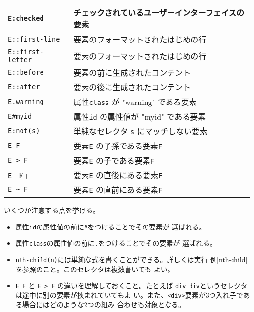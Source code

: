 \begin{longtable}{|m{13em}|m{}|}
\Verb+E:checked+&チェックされているユーザーインターフェイスの要素%
\\\hline
\Verb+E::first-line+&要素のフォーマットされたはじめの行%
\\\hline
\Verb+E::first-letter+&要素のフォーマットされたはじめの行%
\\\hline
\Verb+E::before+&要素の前に生成されたコンテント%
\\\hline
\Verb+E::after+&要素の後に生成されたコンテント%
\\\hline
\Verb+E.warning+&属性\texttt{class} が "warning" である要素%
\\\hline
\Verb+E#myid+&属性\texttt{id} の属性値が "myid" である要素%
\\\hline
\Verb+E:not(s)+&単純なセレクタ \texttt{s} にマッチしない要素%
\\\hline
\Verb+E F+&要素\texttt{E} の子孫である要素\texttt{F}%
\\\hline
\Verb+E > F+&要素\texttt{E} の子である要素\texttt{F}%
\\\hline
\Verb+E + F+&要素\texttt{E} の直後にある要素\texttt{F}%
\\\hline
\Verb+E ~ F+&要素\texttt{E} の直前にある要素\texttt{F}%
\\\hline
\end{longtable}

いくつか注意する点を挙げる。
\begin{itemize}
 \item 属性\texttt{id}の属性値の前に\texttt{\#}をつけることでその要素が
       選ばれる。
 \item 属性\texttt{class}の属性値の前に\texttt{.}をつけることでその要素が
       選ばれる。
 \item \texttt{nth-child(n)}には単純な式を書くことができる。詳しくは実行
       例\ref{nth-child}を参照のこと。このセレクタは複数書いても
       よい。
 \item \Verb+E F+ と \Verb+E > F+ の違いを理解しておくこと。たとえば
       \texttt{div div}というセレクタは途中に別の要素が挟まれていてもよ
       い。また、\texttt{<div>}要素が3つ入れ子である場合にはどのような2つの組み
       合わせも対象となる。
\end{itemize}


